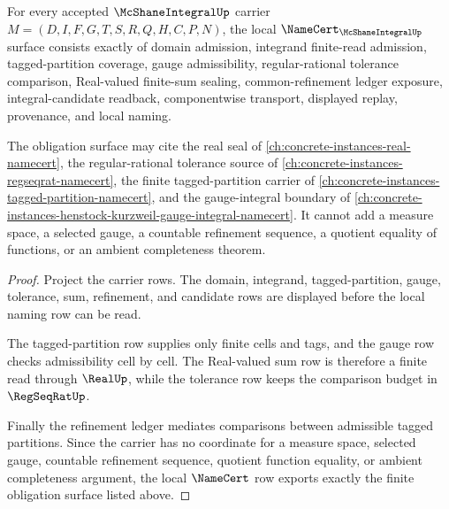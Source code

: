 \begin{theorem}
\label{thm:mcshane-integral-namecert-obligations}
For every accepted $\McShaneIntegralUp$ carrier $M=(D,I,F,G,T,S,R,Q,H,C,P,N)$, the local $\NameCert_{\McShaneIntegralUp}$ surface consists exactly of domain admission, integrand finite-read admission, tagged-partition coverage, gauge admissibility, regular-rational tolerance comparison, Real-valued finite-sum sealing, common-refinement ledger exposure, integral-candidate readback, componentwise transport, displayed replay, provenance, and local naming.

The obligation surface may cite the real seal of \autoref{ch:concrete-instances-real-namecert}, the regular-rational tolerance source of \autoref{ch:concrete-instances-regseqrat-namecert}, the finite tagged-partition carrier of \autoref{ch:concrete-instances-tagged-partition-namecert}, and the gauge-integral boundary of \autoref{ch:concrete-instances-henstock-kurzweil-gauge-integral-namecert}. It cannot add a measure space, a selected gauge, a countable refinement sequence, a quotient equality of functions, or an ambient completeness theorem.
\end{theorem}
\begin{proof}
Project the carrier rows. The domain, integrand, tagged-partition, gauge, tolerance, sum, refinement, and candidate rows are displayed before the local naming row can be read.

The tagged-partition row supplies only finite cells and tags, and the gauge row checks admissibility cell by cell. The Real-valued sum row is therefore a finite read through $\RealUp$, while the tolerance row keeps the comparison budget in $\RegSeqRatUp$.

Finally the refinement ledger mediates comparisons between admissible tagged partitions. Since the carrier has no coordinate for a measure space, selected gauge, countable refinement sequence, quotient function equality, or ambient completeness argument, the local $\NameCert$ row exports exactly the finite obligation surface listed above.
\end{proof}

